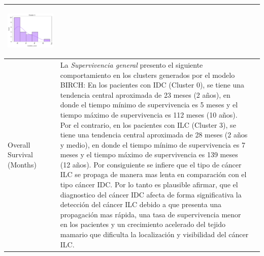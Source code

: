 \begin{table}
\begin{threeparttable}
\begin{tabular}{p{2.5cm} p{7cm} p{6.5cm}}
			\begin{center}\includegraphics[width=1\linewidth]{NOTEBOOK/IMAGENES_BIRCH_CLUSTERING/8_Cluster_3_mutation_count}\end{center}
			
			\\ \hline
			Overall Survival (Months)
			& La \textit{Supervivencia general} presento el siguiente comportamiento en los clusters generados por el modelo BIRCH: En los pacientes con IDC (Cluster 0), se tiene una tendencia central aproximada de 23 meses (2 años), en donde el tiempo mínimo de supervivencia es 5 meses y el tiempo máximo de supervivencia es 112 meses (10 años). Por el contrario, en los pacientes con ILC (Cluster 3), se tiene una tendencia central aproximada de 28 meses (2 años y medio), en donde el tiempo mínimo de supervivencia es 7 meses y el tiempo máximo de supervivencia es 139 meses (12 años). Por consiguiente se infiere que el tipo de cáncer ILC se propaga de manera mas lenta en comparación con el tipo cáncer IDC. Por lo tanto es plausible afirmar, que el diagnostico del cáncer IDC afecta de forma significativa la detección del cáncer ILC debido a que presenta una propagación mas rápida, una tasa de supervivencia menor en los pacientes y un crecimiento acelerado del tejido mamario que dificulta la localización y visibilidad del cáncer ILC. 
			

\end{tabular}
\end{threeparttable}
\end{table}
